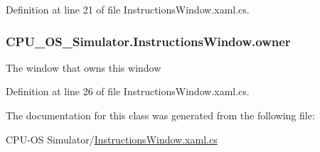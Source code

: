 Definition at line 21 of file Instructions\+Window.\+xaml.\+cs.

\hypertarget{class_c_p_u___o_s___simulator_1_1_instructions_window_a954c950c677c61a3b7ed7406b6dc7164}{}
\subsubsection[{owner}]{ C\+P\+U\+\_\+\+O\+S\+\_\+\+Simulator.\+Instructions\+Window.\+owner\hspace{0.3cm}{\ttfamily [private]}}\label{class_c_p_u___o_s___simulator_1_1_instructions_window_a954c950c677c61a3b7ed7406b6dc7164}


The window that owns this window 



Definition at line 26 of file Instructions\+Window.\+xaml.\+cs.



The documentation for this class was generated from the following file\+:\begin{DoxyCompactItemize}
\item 
C\+P\+U-\/\+O\+S Simulator/\hyperlink{_instructions_window_8xaml_8cs}{Instructions\+Window.\+xaml.\+cs}\end{DoxyCompactItemize}
